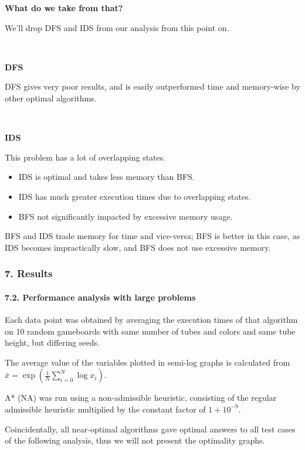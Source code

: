 \documentclass{beamer}
\begin{document}
\begin{frame}%

  {\Large \textbf{What do we take from that?}}

  We'll drop DFS and IDS from our analysis from this point on.

  ~

  \textbf{DFS}

  DFS gives very poor results, and is easily outperformed time and memory-wise by other optimal algorithms.

  ~

  \textbf{IDS}

  This problem has a lot of overlapping states.
  \begin{itemize}
    \item IDS is optimal and takes less memory than BFS.
    \item IDS has much greater execution times due to overlapping states.
    \item BFS not significantly impacted by excessive memory usage.
  \end{itemize}

  BFS and IDS trade memory for time and vice-versa; BFS is better in this case, as IDS becomes impractically slow, and BFS does not use excessive memory.
\end{frame}

\begin{frame}
  \frametitle{7. Results}
  \framesubtitle{7.2. Performance analysis with large problems}

  Each data point was obtained by averaging the execution times of that algorithm on 10 random gameboards with same number of tubes and colors and same tube height, but differing seeds.

  The average value of the variables plotted in semi-log graphs is calculated from $\bar{x} = \exp{\left(\frac{1}{N}\sum_{i=0}^{N}\log{x_i}\right)}$.

  A* (NA) was run using a non-admissible heuristic, consisting of the regular admissible heuristic multiplied by the constant factor of $1+10^{-9}$.

  Coincidentally, all near-optimal algorithms gave optimal answers to all test cases of the following analysis, thus we will not present the optimality graphs.

\end{frame}
\end{document}
